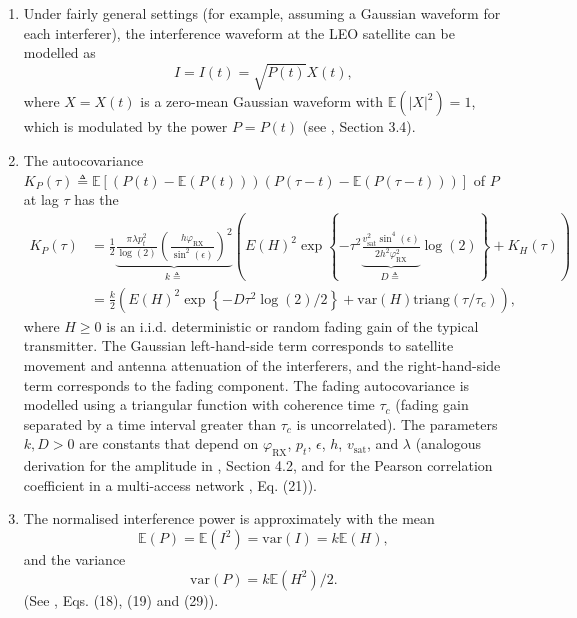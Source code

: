 \documentclass{article}
\begin{document}
                 \begin{enumerate}
                 \item[5.]{Under fairly general settings (for example, assuming a Gaussian waveform for each interferer), the interference waveform at the LEO satellite can be modelled as
                   $$I=I(t)=\sqrt{P(t)}X(t), $$
                   where $X=X(t)$ is a zero-mean Gaussian waveform with $\mathbb{E}(|X|^2)=1$, which is modulated by the power $P=P(t)$ (see , Section 3.4).}
                 \item[6.]{The autocovariance
                   $K_P(\tau) \triangleq \mathbb{E}\left[(P(t)-\mathbb{E}(P(t)))(P(\tau-t)-\mathbb{E}(P(\tau-t)))\right]$
                   of $P$ at lag $\tau$ has the 
                   \begin{align*}
                     \label{eq:K_P}
                     K_{P}(\tau) &= \frac{1}{2} \underbrace{\frac{\pi \lambda p_t^2}{\log(2)}  \left(\frac{h \varphi_{\text{RX}}}{\sin^2(\epsilon)}\right)^2}_{ k\triangleq} \left( E(H)^2\exp\left\{-\tau^2\underbrace{\frac{v_{\text{sat}}^2\sin^4(\epsilon)}{2 h^2 \varphi_{\text{RX}}^2}}_{D\triangleq } \log(2)\right\} + K_H(\tau) \right)  \\
                     &=\frac{k}{2} \left(E(H)^2\exp\left\{-D\tau^2 \log(2)/2\right\} +   \text{var}(H) \text{triang}(\tau/\tau_c) \right), \nonumber
                   \end{align*}
                   where $H \geq 0$ is an i.i.d. deterministic or random fading gain of the typical transmitter. The Gaussian left-hand-side term corresponds to satellite movement and antenna attenuation of the interferers, and the right-hand-side term corresponds to the fading component. The fading autocovariance is modelled using a triangular function with coherence time $\tau_c$ (fading gain separated by a time interval greater than $\tau_c$ is uncorrelated). The parameters $k,D>0$ are constants that depend on $\varphi_{\text{RX}}$, $p_t$, $\epsilon$,  $h$, $v_{\text{sat}}$, and $\lambda$ (analogous derivation for the amplitude in , Section 4.2, and for the Pearson correlation coefficient in a multi-access network , Eq. (21)). }
                   
                 \item[7.]{The normalised interference power is approximately  with the mean
                   $$
                   \mathbb{E}(P)=\mathbb{E}(I^2)=\text{var}(I)= k \mathbb{E}(H),
                   $$
                   and the variance
                   $$
                   \text{var}(P)=k\mathbb{E}(H^2)/2. 
                   $$
                   (See , Eqs. (18), (19) and (29)).}

      

                
                 \end{enumerate}
                 
\end{document}
